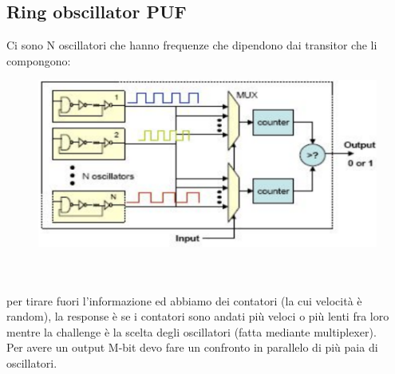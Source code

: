\documentclass[oneside, 12pt]{extbook}
\begin{document}
\subsection{Ring obscillator PUF}
Ci sono N oscillatori che hanno frequenze che dipendono dai transitor che li compongono:\\ 
\begin{figure}[!h]
	\includegraphics[scale=0.4]{immagini/hardware/ro_puf.png}
\end{figure}
\\\\per tirare fuori l'informazione ed abbiamo dei contatori (la cui velocità è random), la response è se i contatori sono andati più veloci o più lenti fra loro mentre la challenge è la scelta degli oscillatori (fatta mediante multiplexer).\\Per avere un output M-bit devo fare un confronto in parallelo di più paia di oscillatori.
\end{document}
